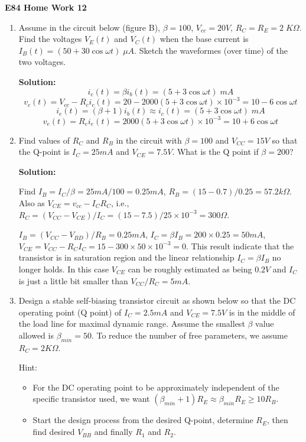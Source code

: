 \usepackage{html}

\begin{center}
{\Large \bf  E84 Home Work 12}
\end{center}
\begin{enumerate}

\item Assume in the circuit below (figure B), $\beta=100$, $V_{cc}=20V$, 
$R_C=R_E=2\;K\Omega$.  Find the voltages $V_E(t)$ and $V_C(t)$ when 
the base current is $I_B(t)=(50+30 \cos \omega t)\;\mu A$. Sketch the
waveformes (over time) of the two voltages.


{\bf Solution:}
 \[ i_c(t)=\beta i_b(t)=(5+3\cos \omega t)\;mA \]
 \[ v_c(t)=V_{cc}-R_c i_c(t)=20-2000 (5+3\cos \omega t)\times 10^{-3}
   =10-6\cos \omega t  \]
 \[ i_e(t)=(\beta+1) i_b(t)\approx i_c(t)=(5+3\cos \omega t)\;mA \]
 \[ v_e(t)=R_e i_e(t)=2000 (5+3\cos \omega t)\times 10^{-3}
    =10+6\cos \omega t  \]

\item Find values of $R_C$ and $R_B$ in the circuit with $\beta=100$
and $V_{CC}=15V$ so that the Q-point is $I_C=25mA$ and $V_{CE}=7.5V$.
What is the Q point if $\beta=200$?


{\bf Solution:}

 Find $I_B=I_C/\beta=25mA/100=0.25mA$, $R_B=(15-0.7)/0.25=57.2k\Omega$.
 Also as $V_{CE}=v_{cc}-I_C R_C$, i.e., $R_C=(V_{CC}-V_{CE})/I_C=
 (15-7.5)/25\times 10^{-3}=300\Omega$. 
 
 $I_B=(V_{CC}-V_{BD})/R_B=0.25mA$, $I_C=\beta I_B=200\times 0.25=50mA$,
 $V_{CE}=V_{CC}-R_C I_C=15-300\times 50\times 10^{-3}=0$.
 This result indicate that the transistor is in saturation region and the
 linear relationship $I_C=\beta I_B$ no longer holds. In this case $V_{CE}$ 
 can be roughly estimated as being $0.2 V$ and $I_C$ is just a little bit
 smaller than $V_{CC}/R_C=5 mA$.

\item Design a stable self-biasing transistor circuit as shown below
so that the DC operating point (Q point) of $I_C=2.5mA$ and $V_{CE}=7.5V$ 
is in the middle of the load line for maximal dynamic range. Assume 
the smallest $\beta$ value allowed is $\beta_{min}=50$. To reduce the 
number of free parameters, we assume $R_C=2K\Omega$. 

Hint: 
\begin{itemize}
\item For the DC operating point to be approximately independent of the
  specific transistor used, we want $(\beta_{min}+1)R_E\approx 
  \beta_{min} R_E \ge 10 R_B$.
\item Start the design process from the desired Q-point, determine $R_E$,
then find desired $V_{BB}$ and finally $R_1$ and $R_2$.
\end{itemize}


\end{enumerate}
